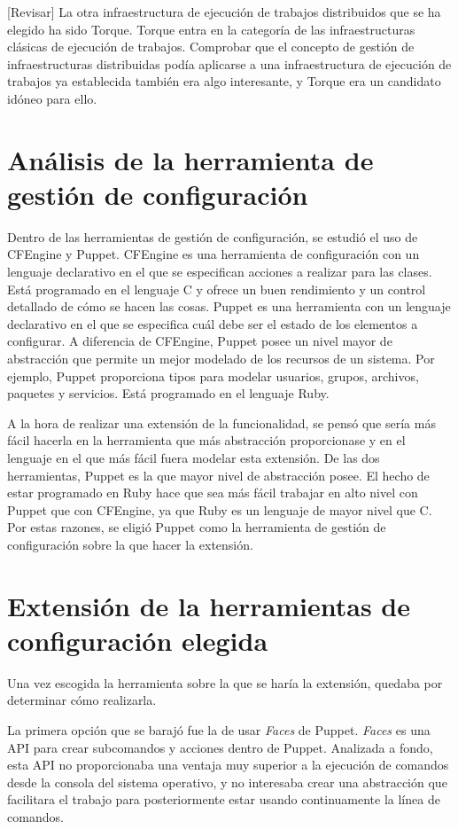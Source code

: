 [Revisar]
La otra infraestructura de ejecución de trabajos distribuidos que se ha elegido ha sido Torque. Torque entra en la categoría de las infraestructuras clásicas de ejecución de trabajos. Comprobar que el concepto de gestión de infraestructuras distribuidas podía aplicarse a una infraestructura de ejecución de trabajos ya establecida también era algo interesante, y Torque era un candidato idóneo para ello.


\section{Análisis de la herramienta de gestión de configuración}

Dentro de las herramientas de gestión de configuración, se estudió el uso de CFEngine y Puppet. CFEngine es una herramienta de configuración con un lenguaje declarativo en el que se especifican acciones a realizar para las clases. Está programado en el lenguaje C y ofrece un buen rendimiento y un control detallado de cómo se hacen las cosas. Puppet es una herramienta con un lenguaje declarativo en el que se especifica cuál debe ser el estado de los elementos a configurar. A diferencia de CFEngine, Puppet posee un nivel mayor de abstracción que permite un mejor modelado de los recursos de un sistema. Por ejemplo, Puppet proporciona tipos para modelar usuarios, grupos, archivos, paquetes y servicios. Está programado en el lenguaje Ruby.

A la hora de realizar una extensión de la funcionalidad, se pensó que sería más fácil hacerla en la herramienta que más abstracción proporcionase y en el lenguaje en el que más fácil fuera modelar esta extensión. De las dos herramientas, Puppet es la que mayor nivel de abstracción posee. El hecho de estar programado en Ruby hace que sea más fácil trabajar en alto nivel con Puppet que con CFEngine, ya que Ruby es un lenguaje de mayor nivel que C. Por estas razones, se eligió Puppet como la herramienta de gestión de configuración sobre la que hacer la extensión.


\section{Extensión de la herramientas de configuración elegida}

Una vez escogida la herramienta sobre la que se haría la extensión, quedaba por determinar cómo realizarla.

La primera opción que se barajó fue la de usar \emph{Faces} de Puppet. \emph{Faces} es una API para crear subcomandos y acciones dentro de Puppet. Analizada a fondo, esta API no proporcionaba una ventaja muy superior a la ejecución de comandos desde la consola del sistema operativo, y no interesaba crear una abstracción que facilitara el trabajo para posteriormente estar usando continuamente la línea de comandos.

